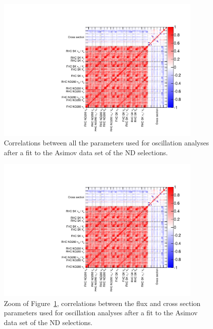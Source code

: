 \begin{figure}[ht]
  \begin{center}
    \includegraphics[width=0.9\textwidth,page=1]{images/BANFF/OutputAsimov_matrices.pdf}
    \caption[Correlations between all the parameters used for
    oscillation analyses after a fit to the Asimov data set of the
    ND280 selections]{Correlations between all the parameters used for
      oscillation analyses after a fit to the \Gls{Asimov} data set of
      the \Gls{ND} selections.}
    \label{fig:asimovcorrall}
  \end{center}
\end{figure}

\begin{figure}[ht]
  \begin{center}
    \includegraphics[width=0.9\textwidth,page=5]{images/BANFF/OutputAsimov_matrices.pdf}
    \caption[Correlations between the flux and cross section
    parameters used for oscillation analyses after a fit to the Asimov
    data set of the ND280 selections]{Zoom of
      Figure~\ref{fig:asimovcorrall}, correlations between the flux
      and cross section parameters used for oscillation analyses after
      a fit to the \Gls{Asimov} data set of the \Gls{ND} selections.}
    \label{fig:asimovcorrzoom}
  \end{center}
\end{figure}


